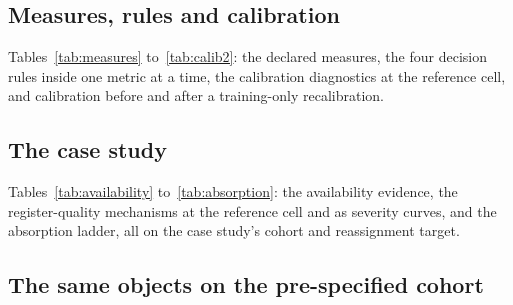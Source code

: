 























\subsection{Measures, rules and calibration}

Tables~\ref{tab:measures} to~\ref{tab:calib2}: the declared measures, the
four decision rules inside one metric at a time, the calibration
diagnostics at the reference cell, and calibration before and after a
training-only recalibration.









\subsection{The case study}

Tables~\ref{tab:availability} to~\ref{tab:absorption}: the availability
evidence, the register-quality mechanisms at the reference cell and as
severity curves, and the absorption ladder, all on the case study's cohort
and reassignment target.









\subsection{The same objects on the pre-specified cohort}

